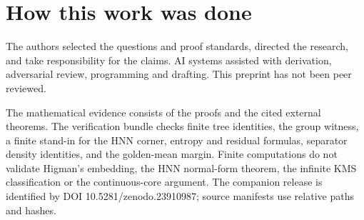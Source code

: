 \section*{How this work was done}\label{sec:methods}
The authors selected the questions and proof standards, directed the
research, and take responsibility for the claims. AI systems assisted
with derivation, adversarial review, programming and drafting.
This preprint has not been peer reviewed.

The mathematical evidence consists of the proofs and the cited external
theorems. The verification bundle checks finite tree identities,
the group witness, a finite stand-in for the HNN corner, entropy and
residual formulas, separator density identities, and the golden-mean
margin. Finite computations do not validate Higman's embedding,
the HNN normal-form theorem, the infinite KMS classification or the
continuous-core argument. The companion release is identified by DOI
10.5281/zenodo.23910987; source manifests use relative paths and hashes.
